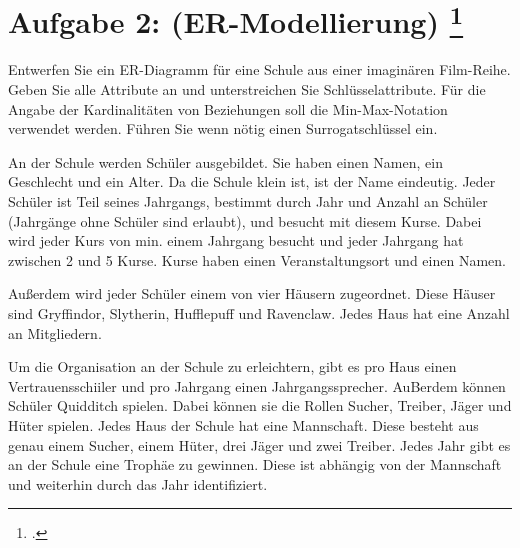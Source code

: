 \documentclass{lehramt-informatik-minimal}
\begin{document}
\section{Aufgabe 2: (ER-Modellierung)
\footcite[Thema 1 Teilaufgabe 2 Aufgabe 2]{examen:66116:2019:09}
}

Entwerfen Sie ein ER-Diagramm für eine Schule aus einer imaginären
Film-Reihe. Geben Sie alle Attribute an und unterstreichen Sie
Schlüsselattribute. Für die Angabe der Kardinalitäten von Beziehungen
soll die Min-Max-Notation verwendet werden. Führen Sie wenn nötig einen
Surrogatschlüssel ein.

An der Schule werden Schüler ausgebildet. Sie haben einen Namen, ein
Geschlecht und ein Alter. Da die Schule klein ist, ist der Name
eindeutig. Jeder Schüler ist Teil seines Jahrgangs, bestimmt durch Jahr
und Anzahl an Schüler (Jahrgänge ohne Schüler sind erlaubt), und besucht
mit diesem Kurse. Dabei wird jeder Kurs von min. einem Jahrgang besucht
und jeder Jahrgang hat zwischen 2 und 5 Kurse. Kurse haben einen
Veranstaltungsort und einen Namen.

Außerdem wird jeder Schüler einem von vier Häusern zugeordnet. Diese
Häuser sind Gryffindor, Slytherin, Hufflepuff und Ravenclaw. Jedes Haus
hat eine Anzahl an Mitgliedern.

Um die Organisation an der Schule zu erleichtern, gibt es pro Haus einen
Vertrauensschiiler und pro Jahrgang einen Jahrgangssprecher. AuBerdem
können Schüler Quidditch spielen. Dabei können sie die Rollen Sucher,
Treiber, Jäger und Hüter spielen. Jedes Haus der Schule hat eine
Mannschaft. Diese besteht aus genau einem Sucher, einem Hüter, drei
Jäger und zwei Treiber. Jedes Jahr gibt es an der Schule eine Trophäe zu
gewinnen. Diese ist abhängig von der Mannschaft und weiterhin durch das
Jahr identifiziert.
\end{document}
